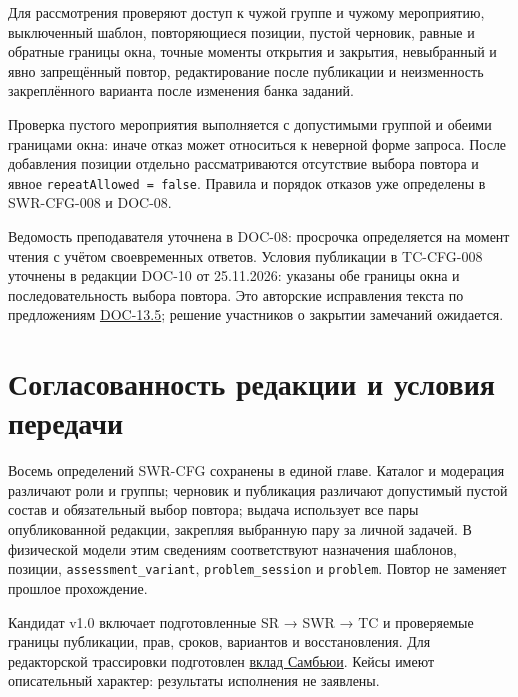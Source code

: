 \documentclass[12pt,a4paper]{article}
\begin{document}
Для рассмотрения проверяют доступ к чужой группе и чужому мероприятию, выключенный шаблон, повторяющиеся позиции, пустой черновик, равные и обратные границы окна, точные моменты открытия и закрытия, невыбранный и явно запрещённый повтор, редактирование после публикации и неизменность закреплённого варианта после изменения банка заданий.

Проверка пустого мероприятия выполняется с допустимыми группой и обеими границами окна: иначе отказ может относиться к неверной форме запроса. После добавления позиции отдельно рассматриваются отсутствие выбора повтора и явное \texttt{repeat\allowbreak{}Allowed =\allowbreak{} false}. Правила и порядок отказов уже определены в SWR-CFG-008 и DOC-08.

Ведомость преподавателя уточнена в DOC-08: просрочка определяется на момент чтения с учётом своевременных ответов. Условия публикации в TC-CFG-008 уточнены в редакции DOC-10 от 25.11.2026: указаны обе границы окна и последовательность выбора повтора. Это авторские исправления текста по предложениям {\href{../08\_Протоколы\_формальных\_инспекций/DOC-13.5\_Протокол\_ФИ-АРХ-API.pdf\#замечания-к-разбору}{DOC-13.5}}; решение участников о закрытии замечаний ожидается.

\section{Согласованность редакции и условия передачи}\label{5-ux441ux43eux433ux43bux430ux441ux43eux432ux430ux43dux43dux43eux441ux442ux44c-ux440ux435ux434ux430ux43aux446ux438ux438-ux438-ux443ux441ux43bux43eux432ux438ux44f-ux43fux435ux440ux435ux434ux430ux447ux438}

\hypertarget{5-согласованность-редакции-и-условия-передачи}{}

Восемь определений SWR-CFG сохранены в единой главе. Каталог и модерация различают роли и группы; черновик и публикация различают допустимый пустой состав и обязательный выбор повтора; выдача использует все пары опубликованной редакции, закрепляя выбранную пару за личной задачей. В физической модели этим сведениям соответствуют назначения шаблонов, позиции, \texttt{assessment\_\allowbreak{}variant}, \texttt{problem\_\allowbreak{}session} и \texttt{problem}. Повтор не заменяет прошлое прохождение.

Кандидат v1.0 включает подготовленные SR → SWR → TC и проверяемые границы публикации, прав, сроков, вариантов и восстановления. Для редакторской трассировки подготовлен {\href{../05\_Трассировка/DOC-09\_Вклад\_Самбьюи.pdf\#doc-09-вклад-самбьюи-в-матрицу-трассировки}{вклад Самбьюи}}. Кейсы имеют описательный характер: результаты исполнения не заявлены.
\end{document}
